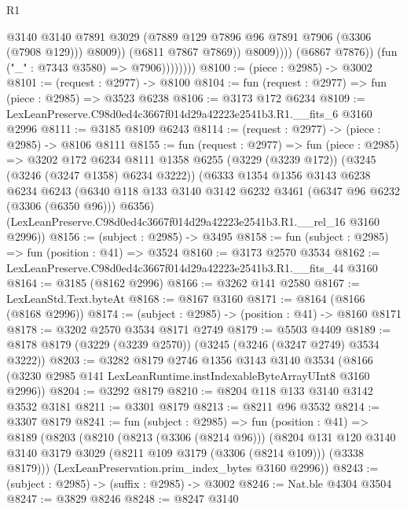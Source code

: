 \begin{lexlean}{R1}
\begin{coremodule}
                                  @3140
                                  @3140
                                  @7891
                                  @3029
                                  (@7889 @129 @7896 @96 @7891 @7906 (@3306 (@7908 @129)))
                                  @8009))
                              (@6811 @7867 @7869))
                            @8009))))
                    (@6867 @7876))
                  (fun ("_" : @7343 @3580) => @7906))))))))
@8100 := (piece : @2985) -> @3002
@8101 := (request : @2977) -> @8100
@8104 := fun (request : @2977) => fun (piece : @2985) => @3523 @6238
@8106 := @3173 @172 @6234
@8109 := LexLeanPreserve.C98d0ed4c3667f014d29a42223e2541b3.R1.__fits_6 @3160 @2996
@8111 := @3185 @8109 @6243
@8114 := (request : @2977) -> (piece : @2985) -> @8106 @8111
@8155 := fun (request : @2977) =>
  fun (piece : @2985) =>
  @3202
    @172
    @6234
    @8111
    @1358
    @6255
    (@3229 (@3239 @172))
    (@3245 (@3246 (@3247 @1358) @6234 @3222))
    (@6333
      @1354
      @1356
      @3143
      @6238
      @6234
      @6243
      (@6340 @118 @133 @3140 @3142 @6232 @3461 (@6347 @96 @6232 (@3306 (@6350 @96))) @6356)
      (LexLeanPreserve.C98d0ed4c3667f014d29a42223e2541b3.R1.__rel_16 @3160 @2996))
@8156 := (subject : @2985) -> @3495
@8158 := fun (subject : @2985) => fun (position : @41) => @3524
@8160 := @3173 @2570 @3534
@8162 := LexLeanPreserve.C98d0ed4c3667f014d29a42223e2541b3.R1.__fits_44 @3160
@8164 := @3185 (@8162 @2996)
@8166 := @3262 @141 @2580
@8167 := LexLeanStd.Text.byteAt
@8168 := @8167 @3160
@8171 := @8164 (@8166 (@8168 @2996))
@8174 := (subject : @2985) -> (position : @41) -> @8160 @8171
@8178 := @3202 @2570 @3534 @8171 @2749
@8179 := @5503 @4409
@8189 := @8178 @8179 (@3229 (@3239 @2570)) (@3245 (@3246 (@3247 @2749) @3534 @3222))
@8203 := @3282
    @8179
    @2746
    @1356
    @3143
    @3140
    @3534
    (@8166 (@3230 @2985 @141 LexLeanRuntime.instIndexableByteArrayUInt8 @3160 @2996))
@8204 := @3292 @8179
@8210 := @8204 @118 @133 @3140 @3142 @3532 @3181
@8211 := @3301 @8179
@8213 := @8211 @96 @3532
@8214 := @3307 @8179
@8241 := fun (subject : @2985) =>
  fun (position : @41) =>
  @8189
    (@8203
      (@8210
        (@8213 (@3306 (@8214 @96)))
        (@8204
          @131
          @120
          @3140
          @3140
          @3179
          @3029
          (@8211 @109 @3179 (@3306 (@8214 @109)))
          (@3338 @8179)))
      (LexLeanPreservation.prim_index_bytes @3160 @2996))
@8243 := (subject : @2985) -> (suffix : @2985) -> @3002
@8246 := Nat.ble @4304 @3504
@8247 := @3829 @8246
@8248 := @8247 @3140

\end{coremodule}
\end{lexlean}
